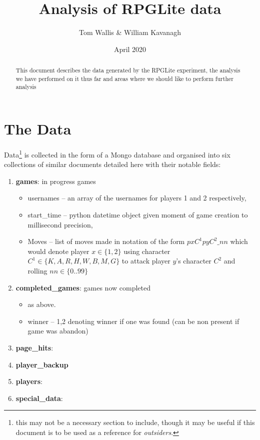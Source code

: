 \documentclass{tufte-handout}
\title{Analysis of RPGLite data}
\author[]{Tom Wallis \& William Kavanagh}
\date{April 2020}  %
\begin{document}
\maketitle%

\begin{abstract}
\noindent This document describes the data generated by the RPGLite experiment, the analysis we have performed on it thus far and areas where we should like to perform further analysis
\end{abstract}


\section{The Data}



Data\footnote{this may not be a necessary section to include, though it may be useful if this document is to be used as a reference for \textit{outsiders}.} is collected in the form of a Mongo database and organised into six collections of similar documents detailed here with their notable fields:
\begin{enumerate}
    \item \textbf{games}: in progress games
    \begin{itemize}
        \item usernames -- an array of the usernames for players 1 and 2 respectively,
        \item start\_time -- python datetime object given moment of game creation to millisecond precision,
        \item Moves -- list of moves made in notation of the form $pxC^1pyC^2\_nn$ which would denote player $x \in \{1,2\}$ using character $C^1 \in \{K,A,R,H,W,B,M,G\}$  to attack player $y$'s character $C^2$ and rolling $nn \in \{0..99\}$ 
    \end{itemize}
    \item \textbf{completed\_games}: games now completed
        \begin{itemize}
        \item as above.
        \item winner -- {1,2} denoting winner if one was found (can be non present if game was abandon)
    \end{itemize}
    \item \textbf{page\_hits}:
    \item \textbf{player\_backup}
    \item \textbf{players}:
    \item \textbf{special\_data}:
\end{enumerate}
\end{document}
